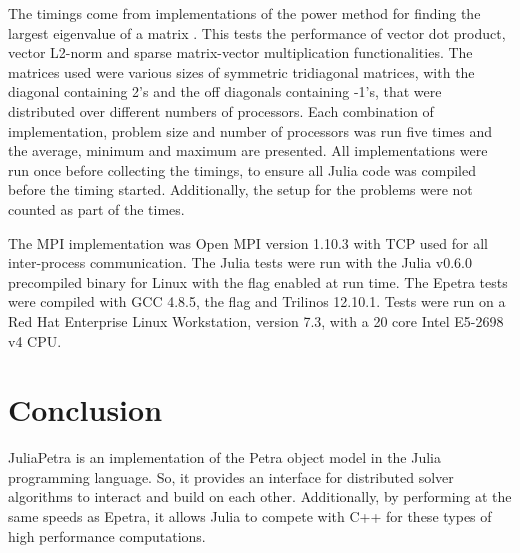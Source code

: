 \documentclass[acmsmall]{acmart}
\newcommand{\snippet}[1]{\texttt{\detokenize{#1}}}
\begin{document}
The timings come from implementations of the power method for finding the largest eigenvalue of a matrix
\cite{Gu:2000:PowerMethod}.
This tests the performance of vector dot product, vector L2-norm and sparse matrix-vector multiplication functionalities.
The matrices used were various sizes of symmetric tridiagonal matrices, with the diagonal containing 2's
and the off diagonals containing -1's, that were distributed over different numbers of processors.
Each combination of implementation, problem size and number of processors was run five times
and the average, minimum and maximum are presented.
All implementations were run once before collecting the timings, to ensure all Julia code was
compiled before the timing started.
Additionally, the setup for the problems were not counted as part of the times.

The MPI implementation was Open MPI version 1.10.3
with TCP used for all inter-process communication.
The Julia tests were run with the Julia v0.6.0 precompiled binary for Linux
with the \snippet{-O3} flag enabled at run time.
The Epetra tests were compiled with GCC 4.8.5, the \snippet{-O3} flag and Trilinos 12.10.1.
Tests were run on a Red Hat Enterprise Linux Workstation, version 7.3,
with a 20 core Intel E5-2698 v4 CPU.

\section{Conclusion}

JuliaPetra is an implementation of the Petra object model in the Julia programming language.
So, it provides an interface for distributed solver algorithms to interact and build on each other.
Additionally, by performing at the same speeds as Epetra,
it allows Julia to compete with C++ for these types of high performance computations.



\end{document}
